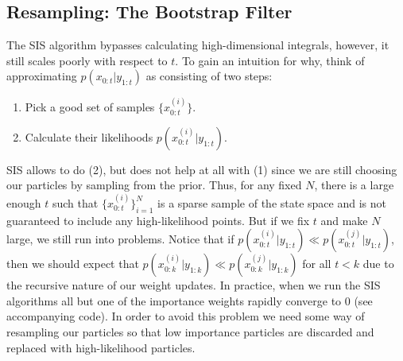 \documentclass{article}
\numberwithin{equation}{section}
\begin{document}
\subsection{Resampling: The Bootstrap Filter}
The SIS algorithm bypasses calculating high-dimensional integrals, however, it still scales poorly with respect
to $t$. To gain an intuition for why, think of approximating $p(x_{0:t}|y_{1:t})$ as consisting of two steps: 
\begin{enumerate}
    \item Pick a good set of samples $\{x_{0:t}^{(i)}\}$. 
    \item Calculate their likelihoods $p(x_{0:t}^{(i)}|y_{1:t})$. 
\end{enumerate}
SIS allows to do (2), but does not help at all with (1) since we are still choosing our particles by sampling from the
prior. Thus, for any fixed $N$, there is a large enough $t$ such that $\{x_{0:t}^{(i)}\}_{i=1}^N$ is a sparse sample of
the state space and is not guaranteed to include any high-likelihood points. But if we fix $t$ and make $N$ large, we
still run into problems. Notice that if $p(x_{0:t}^{(i)}|y_{1:t})\ll p(x_{0:t}^{(j)}|y_{1:t})$, then we
should expect that $p(x_{0:k}^{(i)}|y_{1:k})\ll p(x_{0:k}^{(j)}|y_{1:k})$ for all $t<k$ due to the recursive nature of
our weight updates. In practice, when we run the SIS algorithms all but one of the importance weights rapidly converge to 0
(see accompanying code). In
order to avoid this problem we need some way of resampling our particles so that low importance particles are discarded
and replaced with high-likelihood particles.
\end{document}
